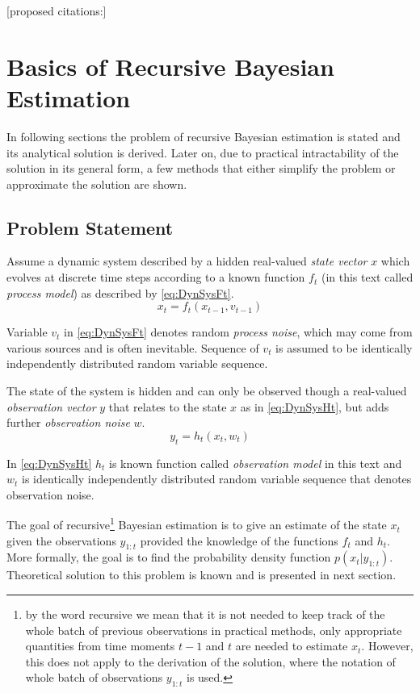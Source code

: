\documentclass[a4paper,12pt,oneside]{report}
\newcommand{\pdf}{probability density function}
\begin{document}
[proposed citations:\cite{ThrBurFox:05,Gus:02,HofSmi:09,HofSmiPech:09,PechHofSmi:09}]


\chapter{Basics of Recursive Bayesian Estimation}

In following sections the problem of recursive Bayesian estimation is stated and its analytical
solution is derived. Later on, due to practical intractability of the solution in its general form,
a few methods that either simplify the problem or approximate the solution are shown.

\section{Problem Statement}

Assume a dynamic system described by a hidden real-valued \emph{state vector} \(x\) which evolves at
discrete time steps according to a known function \(f_t\) (in this text called \emph{process model})
as described by \eqref{eq:DynSysFt}.
\begin{equation} \label{eq:DynSysFt}
	x_t = f_t(x_{t-1}, v_{t-1})
\end{equation}

Variable \(v_t\) in \eqref{eq:DynSysFt} denotes random \emph{process noise}, which may come from various
sources and is often inevitable. Sequence of \(v_t\) is assumed to be identically independently
distributed random variable sequence.

The state of the system is hidden and can only be observed though a real-valued \emph{observation vector}
\(y\) that relates to the state \(x\) as in \eqref{eq:DynSysHt}, but adds further \emph{observation
noise} \(w\).
\begin{equation} \label{eq:DynSysHt}
	y_t = h_t(x_t, w_t)
\end{equation}

In \eqref{eq:DynSysHt} \(h_t\) is known function called \emph{observation model} in this text and \(w_t\) is
identically independently distributed random variable sequence that denotes observation noise.

The goal of recursive\footnote{by the word recursive we mean that it is not needed to keep track of
the whole batch of previous observations in practical methods, only appropriate quantities from time
moments \(t-1\) and \(t\) are needed to estimate \(x_t\). However, this does not apply to the
derivation of the solution, where the notation of whole batch of observations \(y_{1:t}\) is used.}
Bayesian estimation is to give an estimate of the state \(x_t\) given the
observations \(y_{1:t}\) provided the knowledge of the functions \(f_t\) and \(h_t\).
More formally, the goal is to find the {\pdf} \(p(x_t | y_{1:t})\).
Theoretical solution to this problem is known and is presented in next section.
\end{document}
